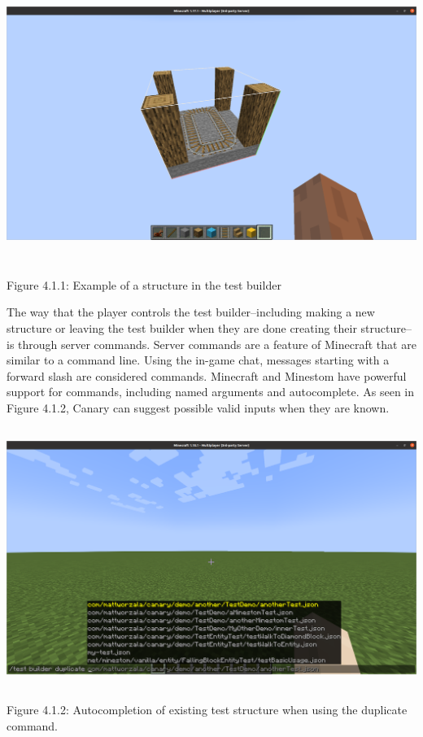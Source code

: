 \documentclass{article}
\begin{document}
\begin{onehalfspacing}
\includegraphics[width=6.5in,height=3.56548in]{media/media/image9.png}

Figure 4.1.1: Example of a structure in the test builder

The way that the player controls the test builder--including making a
new structure or leaving the test builder when they are done creating
their structure--is through server commands. Server commands are a
feature of Minecraft that are similar to a command line. Using the
in-game chat, messages starting with a forward slash are considered
commands. Minecraft and Minestom have powerful support for commands,
including named arguments and autocomplete. As seen in Figure 4.1.2,
Canary can suggest possible valid inputs when they are known.

\includegraphics[width=6.0625in,height=3.32292in]{media/media/image13.png}

Figure 4.1.2: Autocompletion of existing test structure when using the
duplicate command.


\end{onehalfspacing}
\end{document}
